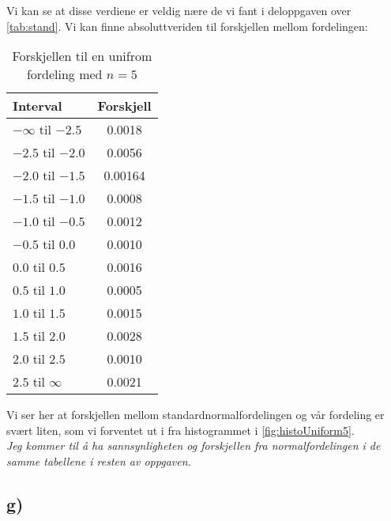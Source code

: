 \documentclass[a4paper,norsk, 10pt]{article}
\begin{document}
Vi kan se at disse verdiene er veldig nære de vi fant i deloppgaven over \ref{tab:stand}. Vi kan finne absoluttveriden til forskjellen mellom fordelingen:

\begin{table}[H]
\centering
\begin{tabular}{|l|c|}
\hline
Interval & Forskjell\\
\hline
$- \infty$ til $-2.5$ & 0.0018\\
$- 2.5$ til $-2.0$ & 0.0056\\
$- 2.0$ til $-1.5$ & 0.00164\\
$- 1.5$ til $-1.0$ & 0.0008\\
$- 1.0$ til $-0.5$ & 0.0012\\
$- 0.5$ til $0.0$ & 0.0010\\

$ 0.0$ til $0.5$ & 0.0016\\
$ 0.5$ til $1.0$ & 0.0005\\
$ 1.0$ til $1.5$ & 0.0015\\
$ 1.5$ til $2.0$ & 0.0028\\
$ 2.0$ til $2.5$ & 0.0010\\
$ 2.5$ til $\infty$ & 0.0021\\ \hline
\end{tabular}
\caption{Forskjellen til en unifrom fordeling med $n = 5$}
\label{tab:forskjellUniform5}
\end{table}

Vi ser her at forskjellen mellom standardnormalfordelingen og vår fordeling er svært liten, som vi forventet ut i fra histogrammet i \ref{fig:histoUniform5}.\\

\textit{Jeg kommer til å ha sannsynligheten og forskjellen fra normalfordelingen i de samme tabellene i resten av oppgaven.}

\subsection*{g)}
\end{document}

